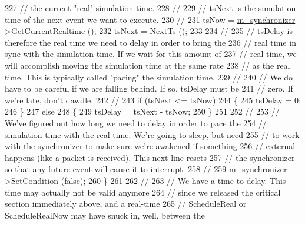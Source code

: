 \begin{DoxyCode}
227         \textcolor{comment}{// the current "real" simulation time.}
228         \textcolor{comment}{//}
229         \textcolor{comment}{// tsNext is the simulation time of the next event we want to execute.}
230         \textcolor{comment}{//}
231         tsNow = \hyperlink{classns3_1_1RealtimeSimulatorImpl_a87a72268b521afcae7ea4c891c398d27}{m\_synchronizer}->GetCurrentRealtime ();
232         tsNext = \hyperlink{classns3_1_1RealtimeSimulatorImpl_ad2666b69c7f58599a68771e9d1544d26}{NextTs} ();
233 
234         \textcolor{comment}{//}
235         \textcolor{comment}{// tsDelay is therefore the real time we need to delay in order to bring the}
236         \textcolor{comment}{// real time in sync with the simulation time.  If we wait for this amount of}
237         \textcolor{comment}{// real time, we will accomplish moving the simulation time at the same rate}
238         \textcolor{comment}{// as the real time.  This is typically called "pacing" the simulation time.}
239         \textcolor{comment}{//}
240         \textcolor{comment}{// We do have to be careful if we are falling behind.  If so, tsDelay must be}
241         \textcolor{comment}{// zero.  If we're late, don't dawdle.}
242         \textcolor{comment}{//}
243         \textcolor{keywordflow}{if} (tsNext <= tsNow)
244           \{
245             tsDelay = 0;
246           \}
247         \textcolor{keywordflow}{else}
248           \{
249             tsDelay = tsNext - tsNow;
250           \}
251 
252         \textcolor{comment}{//}
253         \textcolor{comment}{// We've figured out how long we need to delay in order to pace the }
254         \textcolor{comment}{// simulation time with the real time.  We're going to sleep, but need}
255         \textcolor{comment}{// to work with the synchronizer to make sure we're awakened if something }
256         \textcolor{comment}{// external happens (like a packet is received).  This next line resets}
257         \textcolor{comment}{// the synchronizer so that any future event will cause it to interrupt.}
258         \textcolor{comment}{//}
259         \hyperlink{classns3_1_1RealtimeSimulatorImpl_a87a72268b521afcae7ea4c891c398d27}{m\_synchronizer}->SetCondition (\textcolor{keyword}{false});
260       \}
261 
262       \textcolor{comment}{//}
263       \textcolor{comment}{// We have a time to delay.  This time may actually not be valid anymore}
264       \textcolor{comment}{// since we released the critical section immediately above, and a real-time}
265       \textcolor{comment}{// ScheduleReal or ScheduleRealNow may have snuck in, well, between the }

\end{DoxyCode}
